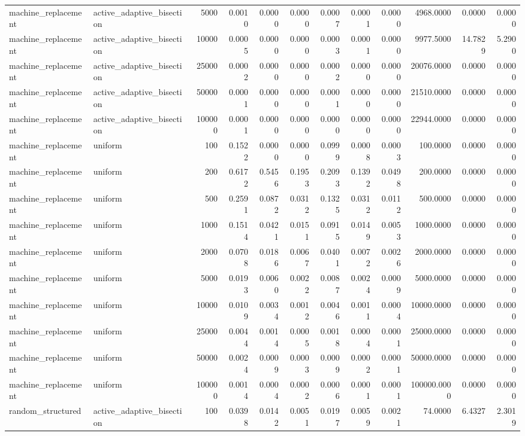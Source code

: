\begin{tabular}{llrrrrrrrrrr}
machine_replacement & active_adaptive_bisection & 5000 & 0.0010 & 0.0000 & 0.0000 & 0.0007 & 0.0001 & 0.0000 & 4968.0000 & 0.0000 & 0.0000 \\
machine_replacement & active_adaptive_bisection & 10000 & 0.0005 & 0.0000 & 0.0000 & 0.0003 & 0.0001 & 0.0000 & 9977.5000 & 14.7829 & 5.2900 \\
machine_replacement & active_adaptive_bisection & 25000 & 0.0002 & 0.0000 & 0.0000 & 0.0002 & 0.0000 & 0.0000 & 20076.0000 & 0.0000 & 0.0000 \\
machine_replacement & active_adaptive_bisection & 50000 & 0.0001 & 0.0000 & 0.0000 & 0.0001 & 0.0000 & 0.0000 & 21510.0000 & 0.0000 & 0.0000 \\
machine_replacement & active_adaptive_bisection & 100000 & 0.0001 & 0.0000 & 0.0000 & 0.0000 & 0.0000 & 0.0000 & 22944.0000 & 0.0000 & 0.0000 \\
machine_replacement & uniform & 100 & 0.1522 & 0.0000 & 0.0000 & 0.0999 & 0.0008 & 0.0003 & 100.0000 & 0.0000 & 0.0000 \\
machine_replacement & uniform & 200 & 0.6172 & 0.5456 & 0.1953 & 0.2093 & 0.1392 & 0.0498 & 200.0000 & 0.0000 & 0.0000 \\
machine_replacement & uniform & 500 & 0.2591 & 0.0872 & 0.0312 & 0.1325 & 0.0312 & 0.0112 & 500.0000 & 0.0000 & 0.0000 \\
machine_replacement & uniform & 1000 & 0.1514 & 0.0421 & 0.0151 & 0.0915 & 0.0149 & 0.0053 & 1000.0000 & 0.0000 & 0.0000 \\
machine_replacement & uniform & 2000 & 0.0708 & 0.0186 & 0.0067 & 0.0401 & 0.0072 & 0.0026 & 2000.0000 & 0.0000 & 0.0000 \\
machine_replacement & uniform & 5000 & 0.0193 & 0.0060 & 0.0022 & 0.0087 & 0.0024 & 0.0009 & 5000.0000 & 0.0000 & 0.0000 \\
machine_replacement & uniform & 10000 & 0.0109 & 0.0034 & 0.0012 & 0.0046 & 0.0011 & 0.0004 & 10000.0000 & 0.0000 & 0.0000 \\
machine_replacement & uniform & 25000 & 0.0044 & 0.0014 & 0.0005 & 0.0018 & 0.0004 & 0.0001 & 25000.0000 & 0.0000 & 0.0000 \\
machine_replacement & uniform & 50000 & 0.0024 & 0.0009 & 0.0003 & 0.0009 & 0.0002 & 0.0001 & 50000.0000 & 0.0000 & 0.0000 \\
machine_replacement & uniform & 100000 & 0.0014 & 0.0004 & 0.0002 & 0.0006 & 0.0001 & 0.0001 & 100000.0000 & 0.0000 & 0.0000 \\
random_structured & active_adaptive_bisection & 100 & 0.0398 & 0.0142 & 0.0051 & 0.0197 & 0.0059 & 0.0021 & 74.0000 & 6.4327 & 2.3019 \\

\end{tabular}
